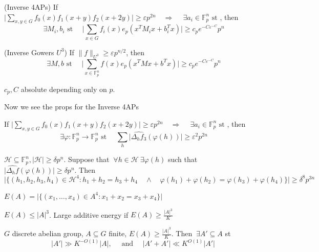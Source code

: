 \begin{theorem}(Inverse 4APs) If
$\lvert \sum_{x, y \in G} f_0(x) f_1(x+y)f_2(x+2y) \rvert \geq \varepsilon p^{2n} \quad  \Rightarrow \quad \ \exists a_i \in \mathbb{F}_p^{n} \text{ st }$, then
\[
\ \exists M_i, b_i \text{ st } \quad \lvert \sum_{x \in G}f_i(x)e_p(x^T M_i x + b_i^T x) \rvert \geq  c_p e^{-C \varepsilon ^{-C}} p^n
\]
\end{theorem}

\begin{theorem}(Inverse Gowers $U^3$) If $\lVert f \rVert_{U^{3}} \geq \varepsilon p^{n/2}$, then
\[
\ \exists M, b \text{ st } \quad \lvert \sum_{x \in \mathbb{F}_p^n} f(x)e_p(x^TMx + b^Tx) \rvert \geq c_p e^{-C\varepsilon ^{-C}}p^n
\]
\end{theorem}

$c_p, C$ absolute depending only on $p$.

Now we see the props for the Inverse 4APs

\begin{proposition} If
$\lvert \sum_{x, y \in G} f_0(x) f_1(x+y)f_2(x+2y) \rvert \geq \varepsilon p^{2n} \quad  \Rightarrow \quad \ \exists a_i \in \mathbb{F}_p^{n} \text{ st }$, then
\[
\ \exists \varphi : \mathbb{F}_p^n \to \mathbb{F}_p^n \text{ st } \quad \sum_{h} \lvert \hat{\Delta_hf_3 }(\varphi (h)) \rvert \geq \varepsilon ^2 p^{2n}
\]
\end{proposition}

\begin{proposition}
$\mathcal{H} \subseteq \mathbb{F}_p^{n}, \lvert \mathcal{H}  \rvert \geq \delta p^{n}$. Suppose that $\ \forall h \in \mathcal{H} \ \exists \varphi (h) $ such that
$\lvert \hat{\Delta _h f}(\varphi (h))\rvert \geq \delta p^{n}$. Then
\[
\lvert \{ (h_1, h_2, h_3, h_4) \in \mathcal{H}^4 : h_1 + h_2 = h_3 + h_4 \quad \land \quad \varphi (h_1) + \varphi (h_2) = \varphi (h_3) + \varphi (h_4) \} \rvert \geq \delta ^{8} p^{3n}
\]
\end{proposition}

\begin{definition}
$E(A) = \lvert \{(x_1, \ldots, x_4) \in A^4 : x_1 + x_2 = x_3 + x_4\} \rvert $ 
\end{definition}

$E(A) \leq \lvert A \rvert^{3} $. Large additive energy if $E(A) \geq \frac{\lvert A \rvert ^3}{K}$

\begin{theorem}
$G$ discrete abelian group, $A \subseteq G$ finite, $E(A) \geq \frac{\lvert A \rvert ^{3} }{K}$. Then $\ \exists A' \subseteq A$ st
\[
\lvert A' \rvert \gg K^{-O(1)} \lvert A \rvert , \quad  \text{ and } \quad \lvert A' + A' \rvert \ll K^{O(1)} \lvert A' \rvert 
\]
\end{theorem}

